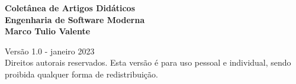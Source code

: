 \thispagestyle{empty}

\newpage
\thispagestyle{empty}
\vspace*{4.5cm}
\begin{center}
{\Huge \bf Coletânea de Artigos Didáticos}\\ 
\vspace*{0.6cm}
{\Huge \bf Engenharia de Software Moderna}\\ 
\vspace*{3cm}
{\Large \bf Marco Tulio Valente}
\end{center}
\newpage

\thispagestyle{empty}
\vspace*{3cm}
\begin{center}
{\Large  Versão 1.0 - janeiro 2023}\\ 
\vspace*{1cm}
{Direitos autorais reservados. Esta versão é para uso pessoal e individual, sendo proibida qualquer forma de redistribuição.}
\end{center}
\newpage

\tableofcontents
